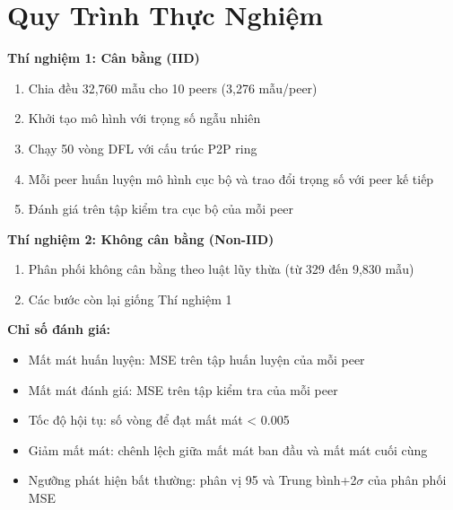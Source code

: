 \section{Quy Trình Thực Nghiệm}

\textbf{Thí nghiệm 1: Cân bằng (IID)}
\begin{enumerate}
    \item Chia đều 32,760 mẫu cho 10 peers (3,276 mẫu/peer)
    \item Khởi tạo mô hình với trọng số ngẫu nhiên
    \item Chạy 50 vòng DFL với cấu trúc P2P ring
    \item Mỗi peer huấn luyện mô hình cục bộ và trao đổi trọng số với peer kế tiếp
    \item Đánh giá trên tập kiểm tra cục bộ của mỗi peer
\end{enumerate}

\textbf{Thí nghiệm 2: Không cân bằng (Non-IID)}
\begin{enumerate}
    \item Phân phối không cân bằng theo luật lũy thừa (từ 329 đến 9,830 mẫu)
    \item Các bước còn lại giống Thí nghiệm 1
\end{enumerate}

\textbf{Chỉ số đánh giá:}
\begin{itemize}
    \item Mất mát huấn luyện: MSE trên tập huấn luyện của mỗi peer
    \item Mất mát đánh giá: MSE trên tập kiểm tra của mỗi peer
    \item Tốc độ hội tụ: số vòng để đạt mất mát < 0.005
    \item Giảm mất mát: chênh lệch giữa mất mát ban đầu và mất mát cuối cùng
    \item Ngưỡng phát hiện bất thường: phân vị 95 và Trung bình+2$\sigma$ của phân phối MSE
\end{itemize}
